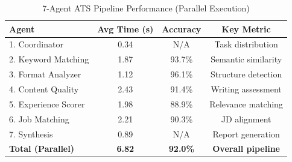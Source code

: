 \begin{table}[h]
\centering
\caption{7-Agent ATS Pipeline Performance (Parallel Execution)}
\label{tab:agent_pipeline}
\begin{tabular}{lccc}
\toprule
\textbf{Agent} & \textbf{Avg Time (s)} & \textbf{Accuracy} & \textbf{Key Metric} \\
\midrule
1. Coordinator       & 0.34  & N/A    & Task distribution \\
2. Keyword Matching  & 1.87  & 93.7\% & Semantic similarity \\
3. Format Analyzer   & 1.12  & 96.1\% & Structure detection \\
4. Content Quality   & 2.43  & 91.4\% & Writing assessment \\
5. Experience Scorer & 1.98  & 88.9\% & Relevance matching \\
6. Job Matching      & 2.21  & 90.3\% & JD alignment \\
7. Synthesis         & 0.89  & N/A    & Report generation \\
\midrule
\textbf{Total (Parallel)} & \textbf{6.82} & \textbf{92.0\%} & \textbf{Overall pipeline} \\
\bottomrule
\end{tabular}
\end{table}
